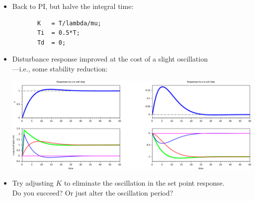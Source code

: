 \begin{frame}[fragile]
\myPause
 \begin{itemize}[<+-| alert@+>]
 \item Back to PI, but halve the integral time:
       {\scriptsize
       \begin{verbatim}
       K   = T/lambda/mu;
       Ti  = 0.5*T;
       Td  = 0;
       \end{verbatim}
       }
 \item \vspace{-3mm}Disturbance response improved at the cost of a slight oscillation\\
       ---i.e., some stability reduction:
       \begin{center}
        \includegraphics[width=0.60\columnwidth]{./Unit-07/img/PIDactions-scilab-03.pdf}
       \end{center}
 \item Try adjusting $K$ to eliminate the oscillation in the set point response.\\
       Do you succeed? Or just alter the oscillation period?
 \end{itemize}
\end{frame}

